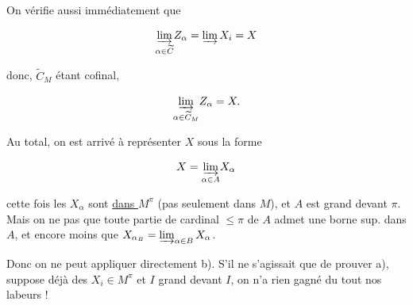 
On vérifie aussi immédiatement que

\[
 \underset{\alpha\in\widetilde C}{\varinjlim} Z_\alpha=\varinjlim X_i=X
\]

donc, $\widetilde C_M$ étant cofinal,

\[
 \underset{\alpha\in\widetilde C_M}{\varinjlim} Z_\alpha=X.
\]


Au total, on est arrivé à représenter $X$ sous la forme

\[
 X=\underset{\alpha\in A}{\varinjlim} X_\alpha
\]

 cette fois les $X_\alpha$ sont \uline{dans $M^\pi$} (pas seulement dans $M$), et $A$ est  grand devant $\pi$.  Mais on ne  pas que  toute partie  de cardinal $\leq\pi$ de $A$ admet une borne sup.  dans $A$, et encore moins que $X_{\alpha_B}=\varinjlim_{\alpha\in B} X_\alpha$.


Donc on ne peut  appliquer directement b). S'il ne s'agissait que de prouver  a),  suppose déjà des $X_i\in M^\pi$ et $I$ grand devant $I$, on n'a rien gagné du tout  nos labeurs !

